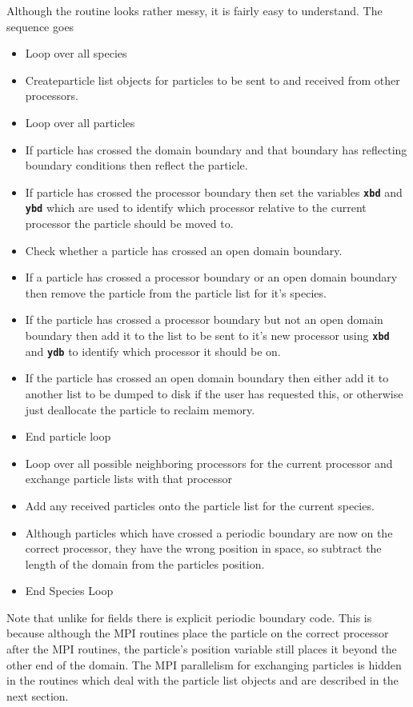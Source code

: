 \documentclass[12pt,a4paper]{article}
\newcommand{\inlinecode}[1]{{\color{warwickred} \bf\texttt{#1}}}
\begin{document}
Although the routine looks rather messy, it is fairly easy to understand. The
sequence goes
\begin{itemize}
\item Loop over all species
\item Createparticle list objects for particles to be sent to and received from
  other processors.
\item Loop over all particles
\item If particle has crossed the domain boundary and that boundary has
  reflecting boundary conditions then reflect the particle.
\item If particle has crossed the processor boundary then set the variables
  \inlinecode{xbd} and \inlinecode{ybd} which are used to identify which
  processor relative to the current processor the particle should be moved to.
\item Check whether a particle has crossed an open domain boundary.
\item If a particle has crossed a processor boundary or an open domain boundary
  then remove the particle from the particle list for it's species.
\item If the particle has crossed a processor boundary but not an open domain
  boundary then add it to the list to be sent to it's new processor using
  \inlinecode{xbd} and \inlinecode{ydb} to identify which processor it should
  be on.
\item If the particle has crossed an open domain boundary then either add it to
  another list to be dumped to disk if the user has requested this, or
  otherwise just deallocate the particle to reclaim memory.
\item End particle loop
\item Loop over all possible neighboring processors for the current processor
  and exchange particle lists with that processor
\item Add any received particles onto the particle list for the current
  species.
\item Although particles which have crossed a periodic boundary are now on the
  correct processor, they have the wrong position in space, so subtract the
  length of the domain from the particles position.
\item End Species Loop
\end{itemize}

Note that unlike for fields there is explicit periodic boundary code. This is
because although the MPI routines place the particle on the correct processor
after the MPI routines, the particle's position variable still places it beyond
the other end of the domain. The MPI parallelism for exchanging particles is
hidden in the routines which deal with the particle list objects and are
described in the next section.
\pagebreak
\end{document}
